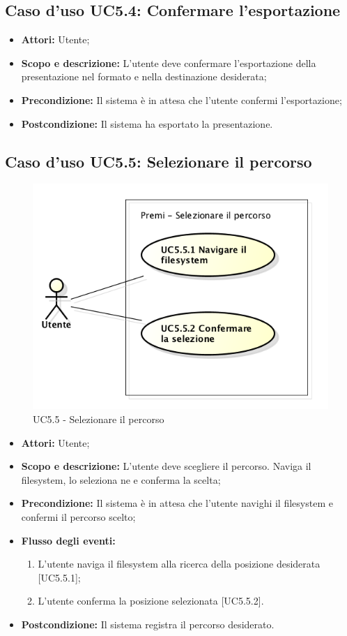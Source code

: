 \subsection{Caso d'uso UC5.4: Confermare l'esportazione}
	\begin{itemize}
		\item \textbf{Attori:} Utente;
		\item \textbf{Scopo e descrizione:} L'utente deve confermare l'esportazione della presentazione nel formato e nella destinazione desiderata;
		\item \textbf{Precondizione:} Il sistema è in attesa che l'utente confermi l'esportazione;
		\item \textbf{Postcondizione:} Il sistema ha esportato la presentazione.
	\end{itemize}
	
	
\subsection{Caso d'uso UC5.5: Selezionare il percorso}
	\begin{figure}[h] 
		\centering 
		\includegraphics[scale=0.45] {img/UC5.5.png} 
		\caption{UC5.5 - Selezionare il percorso} 
	\end{figure}
	\begin{itemize}
		\item \textbf{Attori:} Utente;
		\item \textbf{Scopo e descrizione:} L'utente deve scegliere il percorso. Naviga il \gls{filesystem}, lo seleziona ne e conferma la scelta;
		\item \textbf{Precondizione:} Il sistema è in attesa che l'utente navighi il \gls{filesystem} e confermi il percorso scelto;
		\item \textbf{Flusso degli eventi:}
		\begin{enumerate}
			\item L'utente naviga il \gls{filesystem} alla ricerca della posizione desiderata [UC5.5.1];
			\item L'utente conferma la posizione selezionata [UC5.5.2].
		\end{enumerate}
		\item \textbf{Postcondizione:} Il sistema registra il percorso desiderato.
	\end{itemize}
	
